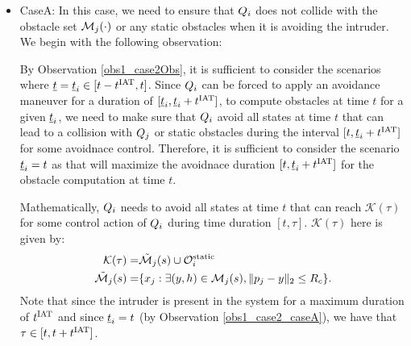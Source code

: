 \begin{itemize}[leftmargin=*] 
\item \label{sec:intruderObs_case2_caseA} CaseA: In this case, we need to ensure that $Q_i$ does not collide with the obstacle set $\mathcal{M}_j(\cdot)$ or any static obstacles when it is avoiding the intruder. We begin with the following observation: 
\begin{observation} \label{obs1_case2_caseA}
By Observation \ref{obs1_case2Obs}, it is sufficient to consider the scenarios where $\underline{t} = \underline{t}_i \in [t-t^\text{IAT}, t]$. Since $Q_i$ can be forced to apply an avoidance maneuver for a duration of $[\underline{t}_i, \underline{t}_i+t^\text{IAT}]$, to compute obstacles at time $t$ for a given $\underline{t}_i$, we need to make sure that $Q_i$ avoid all states at time $t$ that can lead to a collision with $Q_j$ or static obstacles during the interval $[t, \underline{t}_i+t^\text{IAT}]$ for some avoidnace control. Therefore, it is sufficient to consider the scenario $\underline{t}_i = t$ as that will maximize the avoidnace duration $[t, \underline{t}_i+t^\text{IAT}]$ for the obstacle computation at time $t$.  
\end{observation}

Mathematically, $Q_i$ needs to avoid all states at time $t$ that can reach $\mathcal{K}(\tau)$ for some control action of $Q_i$ during time duration $[t, \tau]$. $\mathcal{K}(\tau)$ here is given by:
\begin{equation}
\begin{aligned}
\mathcal{K}(\tau) = & \tilde{\mathcal{M}}_j(s) \cup \mathcal{O}^\text{static}_i\\
\tilde{\mathcal{M}}_j(s) = & \{x_j: \exists (y, h) \in \mathcal{M}_j(s), \|p_j - y\|_2 \le R_c \}.
\end{aligned}
\end{equation}
Note that since the intruder is present in the system for a maximum duration of $t^\text{IAT}$ and since $\underline{t}_i = t$ (by Observation \ref{obs1_case2_caseA}), we have that $\tau \in [t, t+t^\text{IAT}]$. 


\end{itemize}
